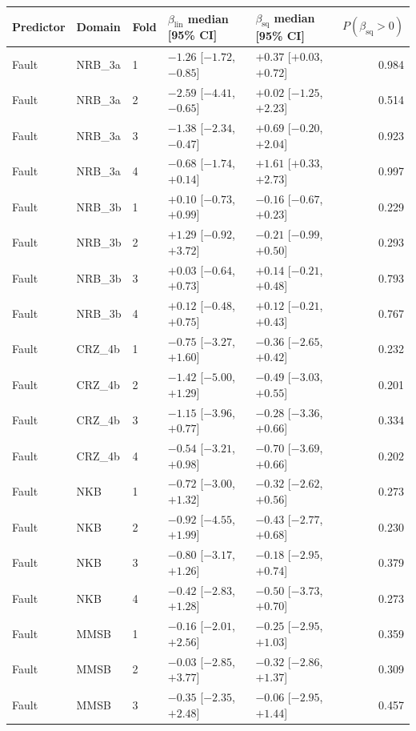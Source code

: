 \begin{tabular}{lllllr}
\toprule
Predictor & Domain & Fold & $\beta_{\mathrm{lin}}$ median [95\% CI] & $\beta_{\mathrm{sq}}$ median [95\% CI] & $P(\beta_{\mathrm{sq}}>0)$ \\
\midrule
Fault & NRB\_3a & 1 & $-1.26$ [$-1.72$, $-0.85$] & $+0.37$ [$+0.03$, $+0.72$] & 0.984 \\
Fault & NRB\_3a & 2 & $-2.59$ [$-4.41$, $-0.65$] & $+0.02$ [$-1.25$, $+2.23$] & 0.514 \\
Fault & NRB\_3a & 3 & $-1.38$ [$-2.34$, $-0.47$] & $+0.69$ [$-0.20$, $+2.04$] & 0.923 \\
Fault & NRB\_3a & 4 & $-0.68$ [$-1.74$, $+0.14$] & $+1.61$ [$+0.33$, $+2.73$] & 0.997 \\
Fault & NRB\_3b & 1 & $+0.10$ [$-0.73$, $+0.99$] & $-0.16$ [$-0.67$, $+0.23$] & 0.229 \\
Fault & NRB\_3b & 2 & $+1.29$ [$-0.92$, $+3.72$] & $-0.21$ [$-0.99$, $+0.50$] & 0.293 \\
Fault & NRB\_3b & 3 & $+0.03$ [$-0.64$, $+0.73$] & $+0.14$ [$-0.21$, $+0.48$] & 0.793 \\
Fault & NRB\_3b & 4 & $+0.12$ [$-0.48$, $+0.75$] & $+0.12$ [$-0.21$, $+0.43$] & 0.767 \\
Fault & CRZ\_4b & 1 & $-0.75$ [$-3.27$, $+1.60$] & $-0.36$ [$-2.65$, $+0.42$] & 0.232 \\
Fault & CRZ\_4b & 2 & $-1.42$ [$-5.00$, $+1.29$] & $-0.49$ [$-3.03$, $+0.55$] & 0.201 \\
Fault & CRZ\_4b & 3 & $-1.15$ [$-3.96$, $+0.77$] & $-0.28$ [$-3.36$, $+0.66$] & 0.334 \\
Fault & CRZ\_4b & 4 & $-0.54$ [$-3.21$, $+0.98$] & $-0.70$ [$-3.69$, $+0.66$] & 0.202 \\
Fault & NKB & 1 & $-0.72$ [$-3.00$, $+1.32$] & $-0.32$ [$-2.62$, $+0.56$] & 0.273 \\
Fault & NKB & 2 & $-0.92$ [$-4.55$, $+1.99$] & $-0.43$ [$-2.77$, $+0.68$] & 0.230 \\
Fault & NKB & 3 & $-0.80$ [$-3.17$, $+1.26$] & $-0.18$ [$-2.95$, $+0.74$] & 0.379 \\
Fault & NKB & 4 & $-0.42$ [$-2.83$, $+1.28$] & $-0.50$ [$-3.73$, $+0.70$] & 0.273 \\
Fault & MMSB & 1 & $-0.16$ [$-2.01$, $+2.56$] & $-0.25$ [$-2.95$, $+1.03$] & 0.359 \\
Fault & MMSB & 2 & $-0.03$ [$-2.85$, $+3.77$] & $-0.32$ [$-2.86$, $+1.37$] & 0.309 \\
Fault & MMSB & 3 & $-0.35$ [$-2.35$, $+2.48$] & $-0.06$ [$-2.95$, $+1.44$] & 0.457 \\

\end{tabular}
